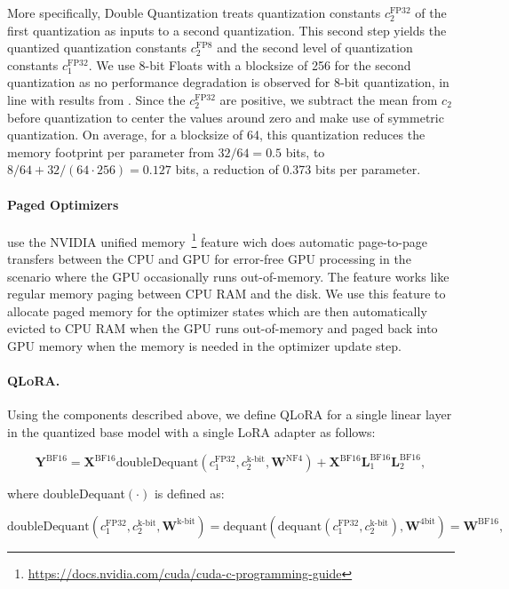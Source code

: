 More specifically, Double Quantization treats quantization constants $c_2^{\text{FP32}}$ of the first quantization as inputs to a second quantization. This second step yields the quantized quantization constants $c_2^{\text{FP8}}$ and the second level of quantization constants $c_1^{\text{FP32}}$. We use 8-bit Floats with a blocksize of 256 for the second quantization as no performance degradation is observed for 8-bit quantization, in line with results from \citet{dettmers2022case}. 
Since the $c_2^{\text{FP32}}$ are positive, we subtract the mean from $c_2$ before quantization to center the values around zero and make use of symmetric quantization. On average, for a blocksize of 64, this quantization reduces the memory footprint per parameter from $32/64=0.5$ bits, to $8/64 + 32/(64\cdot256) = 0.127$ bits, a reduction of 0.373 bits per parameter. 

\paragraph{Paged Optimizers} use the NVIDIA unified memory~\footnote{\tiny \url{https://docs.nvidia.com/cuda/cuda-c-programming-guide}} feature wich does automatic page-to-page transfers between the CPU and GPU for error-free GPU processing in the scenario where the GPU occasionally runs out-of-memory. The feature works like regular memory paging between CPU RAM and the disk. We use this feature to allocate paged memory for the optimizer states which are then automatically evicted to CPU RAM when the GPU runs out-of-memory and paged back into GPU memory when the memory is needed in the optimizer update step.

\paragraph{\textsc{QLoRA}.} Using the components described above, we define \textsc{QLoRA} for a single linear layer in the quantized base model with a single LoRA adapter as follows:

\begin{equation}
    \mathbf{Y}^{\text{BF16}} =  \mathbf{X}^{\text{BF16}} \text{doubleDequant}(c_1^{\text{FP32}}, c_2^{\text{k-bit}}, \mathbf{W}^{\text{NF4}}) + \mathbf{X}^{\text{BF16}}\mathbf{L}^{\text{BF16}}_1\mathbf{L}^{\text{BF16}}_2,
\end{equation}

where doubleDequant$(\cdot)$ is defined as:

\begin{equation}
    \text{doubleDequant}(c_1^{\text{FP32}}, c_2^{\text{k-bit}}, \mathbf{W}^{\text{k-bit}}) = \text{dequant}(\text{dequant}(c_1^{\text{FP32}}, c_2^{\text{k-bit}}), \mathbf{W}^{\text{4bit}}) = \mathbf{W}^{\text{BF16}},
\end{equation}

